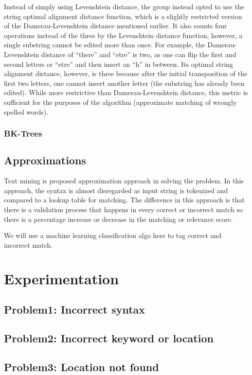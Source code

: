 \documentclass{acm_proc_article-sp}
\begin{document}
Instead of simply using Levenshtein distance, the group instead opted to use the string optimal alignment distance function, which is a slightly restricted version of the Damerau-Levenshtein distance mentioned earlier. It also counts four operations instead of the three by the Levenshtein distance function, however, a single substring cannot be edited more than once. For example, the Damerau-Levenshtein distance of "`there"' and "`etre"' is two, as one can flip the first and second letters or "`etre"' and then insert an "`h"' in between. Its optimal string alignment distance, however, is three because after the initial transposition of the first two letters, one cannot insert another letter (the substring has already been edited). While more restrictive than Damerau-Levenshtein distance, this metric is sufficient for the purposes of the algorithm (approximate matching of wrongly spelled words). 

\subsubsection{BK-Trees}

\subsection{Approximations}
Text mining is proposed approximation approach in solving the problem. In this approach, the syntax is almost disregarded as input string is tokenized and compared to a lookup table for matching. The difference in this approach is that there is a validation process that happens in every correct or incorrect match so there is a percentage increase or decrease in the matching or relevance score. 

We will use a machine learning classification algo here to tag correct and incorrect match.

\section{Experimentation}
\subsection{Problem1: Incorrect syntax}
\subsection{Problem2: Incorrect keyword or location}
\subsection{Problem3: Location not found}
\end{document}
